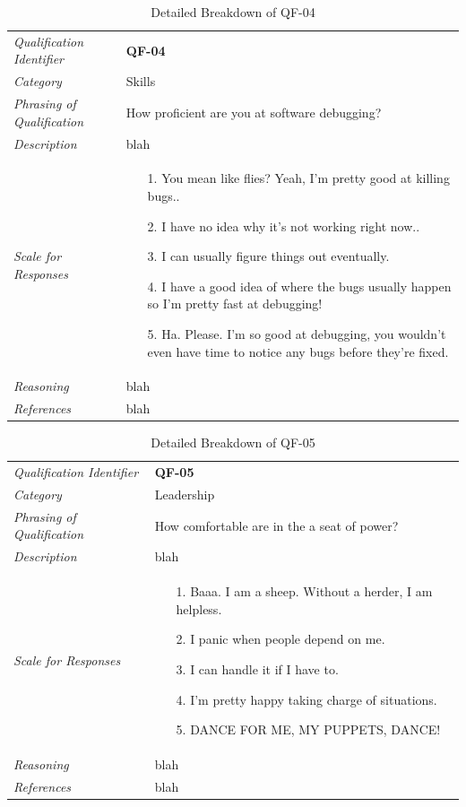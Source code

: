 \documentclass[12pt,letterpaper]{article}
\begin{document}
\begin{table}[H]
	\caption{Detailed Breakdown of QF-04}
	\begin{tabu} to 
		\toprule
		Qualification Identifier & {\bf QF-04}\\
		Category & Skills \\
		Phrasing of Qualification & How proficient are you at software debugging? \\
		Description & blah\\
		Scale for Responses &
		\begin{minipage}[t]{\linewidth}
			\begin{enumerate}
				\item[1.] You mean like flies? Yeah, I'm pretty good at killing bugs..
				\item[2.] I have no idea why it's not working right now..
				\item[3.] I can usually figure things out eventually.
				\item[4.] I have a good idea of where the bugs usually happen so I'm pretty fast at debugging!
				\item[5.] Ha. Please. I'm so good at debugging, you wouldn't even have time to notice any bugs before they're fixed.
			\end{enumerate}
		\end{minipage}\\
		Reasoning & blah\\
		References & blah\\
		\toprule
	\end{tabu}
\end{table}

\begin{table}[H]
	\caption{Detailed Breakdown of QF-05}
	\begin{tabu} to 
		\toprule
		Qualification Identifier & {\bf QF-05}\\
		Category & Leadership \\
		Phrasing of Qualification & How comfortable are in the a seat of power? \\
		Description & blah\\
		Scale for Responses &
		\begin{minipage}[t]{\linewidth}
			\begin{enumerate}
				\item[1.] Baaa. I am a sheep. Without a herder, I am helpless.
				\item[2.] I panic when people depend on me.
				\item[3.] I can handle it if I have to.
				\item[4.] I'm pretty happy taking charge of situations.
				\item[5.] DANCE FOR ME, MY PUPPETS, DANCE!\cite{himym}
			\end{enumerate}
		\end{minipage}\\
		Reasoning & blah\\
		References & blah\\
		\toprule
	\end{tabu}
\end{table}
\end{document}
